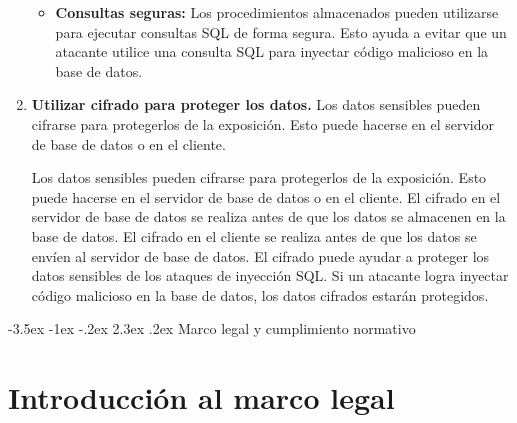 \documentclass[11pt]{report}
\makeatletter
\renewcommand\chapter{\@startsection{chapter}{0}{\z@}%
    {-3.5ex \@plus -1ex \@minus -.2ex}%
    {2.3ex \@plus.2ex}%
    {\normalfont\Large\bfseries}}
\makeatother
\begin{document}
\begin{enumerate}
\begin{itemize}
    \item \textbf{Consultas seguras:} Los procedimientos almacenados pueden utilizarse para ejecutar consultas SQL de forma segura. Esto
    ayuda a evitar que un atacante utilice una consulta SQL para inyectar código malicioso en la base de datos.
  \end{itemize}

  \item \textbf{Utilizar cifrado para proteger los datos.} Los datos sensibles pueden cifrarse para protegerlos de la exposición. Esto puede
  hacerse en el servidor de base de datos o en el cliente.

  Los datos sensibles pueden cifrarse para protegerlos de la exposición. Esto puede hacerse en el servidor de base de datos o en el cliente.
  El cifrado en el servidor de base de datos se realiza antes de que los datos se almacenen en la base de datos. El cifrado en el cliente se
  realiza antes de que los datos se envíen al servidor de base de datos. El cifrado puede ayudar a proteger los datos sensibles de los ataques
  de inyección SQL. Si un atacante logra inyectar código malicioso en la base de datos, los datos cifrados estarán protegidos.
\end{enumerate}

\chapter{Marco legal y cumplimiento normativo}
\section{Introducción al marco legal}
\end{document}
